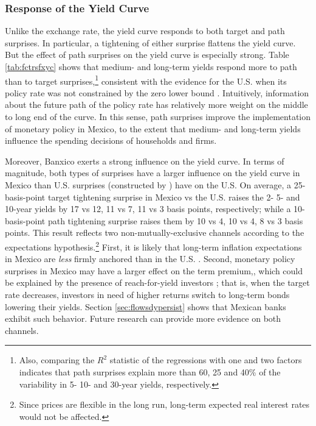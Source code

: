 {\subsubsection{Response of the Yield Curve} \label{sec:onimpactyc}
Unlike the exchange rate, the yield curve responds to both target and path surprises. 
In particular, a tightening of either surprise flattens the yield curve. 
But the effect of path surprises on the yield curve is especially strong. 
Table \ref{tab:fctrsfxyc} shows that %
medium- and long-term yields respond more to path than to target surprises,\footnote{Also, comparing the \(R^{2}\) statistic of the regressions with one and two factors indicates that path surprises explain more than 60, 25 and 40\% of the variability in 5- 10- and 30-year yields, respectively.} consistent with the evidence for the U.S. when its policy rate was not constrained by the zero lower bound \parencite{GSS:2005a}. 
Intuitively, information about the future path of the policy rate has relatively more weight on the middle to long end of the curve. 
In this sense, path surprises improve the implementation of monetary policy in Mexico, to the extent that medium- and long-term yields influence the spending decisions of households and firms.

Moreover, Banxico exerts a strong influence on the yield curve. 
In terms of magnitude, both types of surprises have a larger influence on the yield curve in Mexico than U.S. surprises (constructed by \textcite{GSS:2005a}) have on the U.S. On average, a 25-basis-point target tightening surprise in Mexico vs the U.S. raises the 2- 5- and 10-year yields by 17 vs 12, 11 vs 7, 11 vs 3 basis points, respectively; while a 10-basis-point path tightening surprise raises them by 10 vs 4, 10 vs 4, 8 vs 3 basis points. 
This result reflects two non-mutually-exclusive channels according to the expectations hypothesis.\footnote{Since prices are flexible in the long run, long-term expected real interest rates would not be affected.} 
First, it is likely that long-term inflation expectations in Mexico are \textit{less} firmly anchored than in the U.S. \parencites[cf.][fig. 12]{AndreasenChristensenRiddell:2021}[][fig. 10]{Beauregard_etal:2021}. 
Second, monetary policy surprises in Mexico may have a larger effect on the term premium,, which could be explained by the presence of reach-for-yield investors \parencite{HansonStein:2015}; that is, when the target rate decreases, investors in need of higher returns switch to long-term bonds lowering their yields. 
Section \ref{sec:flowsdypersist} shows that Mexican banks exhibit such behavior. Future research can provide more evidence on both channels.

}
